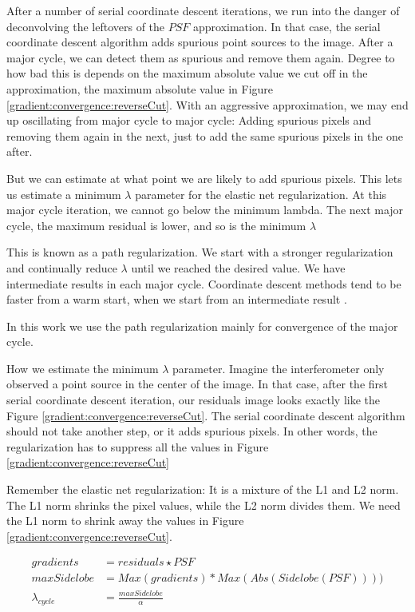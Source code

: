 After a number of serial coordinate descent iterations, we run into the danger of deconvolving the leftovers of the $PSF$ approximation. In that case, the serial coordinate descent algorithm adds spurious point sources to the image. After a major cycle, we can detect them as spurious and remove them again.
Degree to how bad this is depends on the maximum absolute value we cut off in the approximation, the maximum absolute value in Figure \ref{gradient:convergence:reverseCut}. With an aggressive approximation, we may end up oscillating from major cycle to major cycle: Adding spurious pixels and removing them again in the next, just to add the same spurious pixels in the one after.

But we can estimate at what point we are likely to add spurious pixels. This lets us estimate a minimum $\lambda$ parameter for the elastic net regularization. At this major cycle iteration, we cannot go below the minimum lambda. The next major cycle, the maximum residual is lower, and so is the minimum $\lambda$

This is known as a path regularization. We start with a stronger regularization and continually reduce $\lambda$ until we reached the desired value. We have intermediate results in each major cycle. Coordinate descent methods tend to be faster from a warm start, when we start from an intermediate result \cite{friedman2010regularization}. 

In this work we use the path regularization mainly for convergence of the major cycle. 

How we estimate the minimum $\lambda$ parameter. Imagine the interferometer only observed a point source in the center of the image. In that case, 
after the first serial coordinate descent iteration, our residuals image looks exactly like the Figure \ref{gradient:convergence:reverseCut}. The serial coordinate descent algorithm should not take another step, or it adds spurious pixels. In other words, the regularization has to suppress all the values in Figure \ref{gradient:convergence:reverseCut}

Remember the elastic net regularization: It is a mixture of the L1 and L2 norm. The L1 norm shrinks the pixel values, while the L2 norm divides them. We need the L1 norm to shrink away the values in Figure \ref{gradient:convergence:reverseCut}.

\begin{equation}
\begin{split}
gradients &= residuals \star PSF \\
maxSidelobe &= Max(gradients) * Max(Abs(Sidelobe(PSF)))) \\
\lambda_{cycle} &= \frac{maxSidelobe}{\alpha}
\end{split}
\end{equation}

